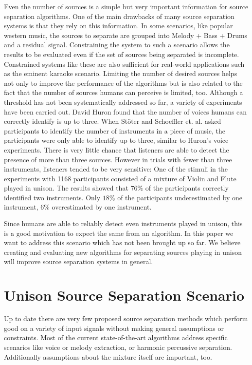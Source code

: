Even the number of sources is a simple but very important information for source separation algorithms. One of the main drawbacks of many source separation systems is that they rely on this information. In some scenarios, like popular western music, the sources to separate are grouped into Melody + Bass + Drums and a residual signal. Constraining the system to such a scenario allows the results to be evaluated even if the set of sources being separated is incomplete. Constrained systems like these are also sufficient for real-world applications such as the eminent karaoke scenario. Limiting the number of desired sources helps not only to improve the performance of the algorithms but is also related to the fact that the number of sources humans can perceive is limited, too. Although a threshold has not been systematically addressed so far, a variety of experiments have been carried out. David Huron found \cite{huron89} that the number of voices humans can correctly identify is up to three. When St\"oter and Schoeffler et. al. \cite{stoeter13, schoeffler13} asked participants to identify the number of instruments in a piece of music, the participants were only able to identify up to three, similar to Huron's voice experiments. There is very little chance that listeners are able to detect the presence of more than three sources. However in trials with fewer than three instruments, listeners tended to be very sensitive: One of the stimuli in the \cite{stoeter13, schoeffler13} experiments with 1168 participants consisted of a mixture of Violin and Flute played in unison. The results showed that $76\%$ of the participants correctly identified two instruments. Only $18\%$ of the participants underestimated by one instrument, $6\%$ overestimated by one instrument.

Since humans are able to reliably detect even instruments played in unison, this is a good motivation to expect the same from an algorithm. In this paper we want to address this scenario which has not been brought up so far. We believe creating and evaluating new algorithms for separating sources playing in unison will improve source separation systems in general.

\section{Unison Source Separation Scenario}
\label{sec:scenario}

Up to date there are very few proposed source separation methods which perform good on a variety of input signals without making general assumptions or constraints. Most of the current state-of-the-art algorithms address specific scenarios like voice or melody extraction, or harmonic percussive separation. Additionally assumptions about the mixture itself are important, too.

